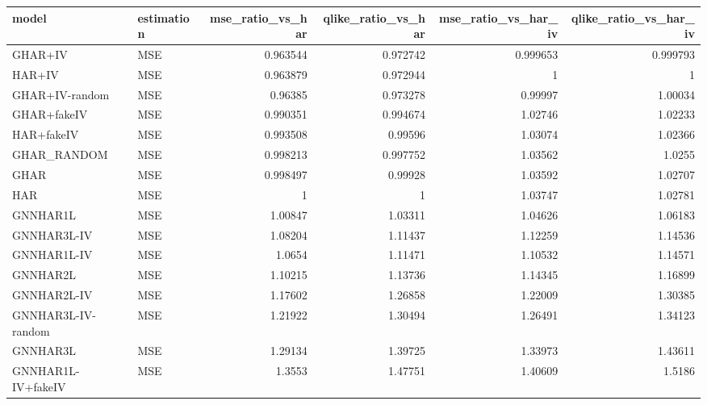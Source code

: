 \begin{tabular}{llrrrr}
\toprule
model & estimation & mse_ratio_vs_har & qlike_ratio_vs_har & mse_ratio_vs_har_iv & qlike_ratio_vs_har_iv \\
\midrule
GHAR+IV & MSE & 0.963544 & 0.972742 & 0.999653 & 0.999793 \\
HAR+IV & MSE & 0.963879 & 0.972944 & 1 & 1 \\
GHAR+IV-random & MSE & 0.96385 & 0.973278 & 0.99997 & 1.00034 \\
GHAR+fakeIV & MSE & 0.990351 & 0.994674 & 1.02746 & 1.02233 \\
HAR+fakeIV & MSE & 0.993508 & 0.99596 & 1.03074 & 1.02366 \\
GHAR_RANDOM & MSE & 0.998213 & 0.997752 & 1.03562 & 1.0255 \\
GHAR & MSE & 0.998497 & 0.99928 & 1.03592 & 1.02707 \\
HAR & MSE & 1 & 1 & 1.03747 & 1.02781 \\
GNNHAR1L & MSE & 1.00847 & 1.03311 & 1.04626 & 1.06183 \\
GNNHAR3L-IV & MSE & 1.08204 & 1.11437 & 1.12259 & 1.14536 \\
GNNHAR1L-IV & MSE & 1.0654 & 1.11471 & 1.10532 & 1.14571 \\
GNNHAR2L & MSE & 1.10215 & 1.13736 & 1.14345 & 1.16899 \\
GNNHAR2L-IV & MSE & 1.17602 & 1.26858 & 1.22009 & 1.30385 \\
GNNHAR3L-IV-random & MSE & 1.21922 & 1.30494 & 1.26491 & 1.34123 \\
GNNHAR3L & MSE & 1.29134 & 1.39725 & 1.33973 & 1.43611 \\
GNNHAR1L-IV+fakeIV & MSE & 1.3553 & 1.47751 & 1.40609 & 1.5186 \\
\bottomrule
\end{tabular}
